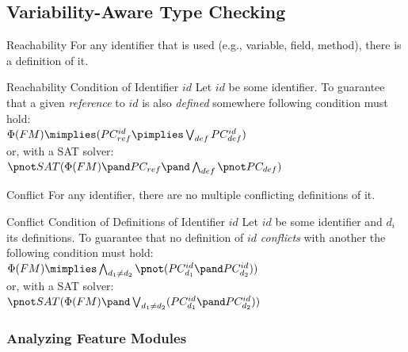 \subsection{Variability-Aware Type Checking}

\begin{frame}[t]{\myframetitle}
	\begin{fancycolumns}[t]
		\begin{example}{Reachability}
			For any identifier that is used (e.g., variable, field, method), there is a definition of it.
		\end{example}
		\begin{definition}{Reachability Condition of Identifier $id$}
			Let $id$ be some identifier. To guarantee that a given \emph{reference} to $id$ is also \emph{defined} somewhere following condition must hold:\\[1ex]
			$\Phi(FM) \mimplies (PC_{ref}^{id} \pimplies \bigvee_{def} PC_{def}^{id})$\\[2ex]
			or, with a SAT solver:\\[1ex]
			\small
			$\pnot SAT(\Phi(FM) \pand PC_{ref} \pand \bigwedge_{def} \pnot PC_{def})$
		\end{definition}
		\nextcolumn{}
		\begin{example}{Conflict}
			For any identifier, there are no multiple conflicting definitions of it.
		\end{example}
		\begin{definition}{Conflict Condition of Definitions of Identifier $id$}
			Let $id$ be some identifier and $d_i$ its definitions.
			To guarantee that no definition of $id$ \emph{conflicts} with another the following condition must hold:\\[1ex]
			$\Phi(FM) \mimplies \bigwedge_{d_1 \neq d_2} \pnot (PC_{d_1}^{id} \pand PC_{d_2}^{id}))$\\[2ex]
			or, with a SAT solver:\\[1ex]
			\small
			$\pnot SAT(\Phi(FM) \pand \bigvee_{d_1 \neq d_2} (PC_{d_1}^{id} \pand PC_{d_2}^{id}))$
		\end{definition}
	\end{fancycolumns}
\end{frame}

\subsubsection{Analyzing Feature Modules}

